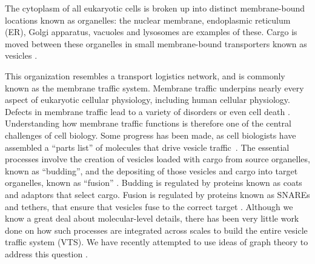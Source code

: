 \noindent 
The cytoplasm of all eukaryotic cells is broken up into distinct membrane-bound locations known as organelles: the
nuclear membrane, endoplasmic reticulum (ER), Golgi apparatus, vacuoles and lysosomes are examples of these.
%
%
%
%
%
%
Cargo is moved between these organelles in small membrane-bound
transporters known as vesicles \cite{stenmark2009rab}.

This organization resembles a transport logistics network, and is commonly known as the membrane traffic system.
%
Membrane traffic underpins nearly every aspect of eukaryotic cellular
physiology, including human cellular physiology.
%
Defects in membrane traffic lead to a variety of disorders or even
cell death \cite{stenmark2009rab}.
%
Understanding how membrane traffic functions is therefore one of the
central challenges of cell biology.
%
Some progress has been made, as cell biologists have assembled a
“parts list” of molecules that drive vesicle
traffic~\cite{dacks2007evolution}.
%
The essential processes involve the creation of vesicles loaded with
cargo from source organelles, known as “budding”, and the depositing
of those vesicles and cargo into target organelles, known as “fusion”
\cite{munro2004organelle}.
%
Budding is regulated by proteins known as coats and adaptors that
select cargo.
%
Fusion is regulated by proteins known as SNAREs and tethers, that
ensure that vesicles fuse to the correct target
\cite{mani2016stacking}.
%
Although we know a great deal about molecular-level details, there has
been very little work done on how such processes are integrated across
scales to build the entire vesicle traffic system (VTS).
%
We have recently attempted to use ideas of graph theory to address
this question \cite{mani2016stacking,shukla2017discovering}.

